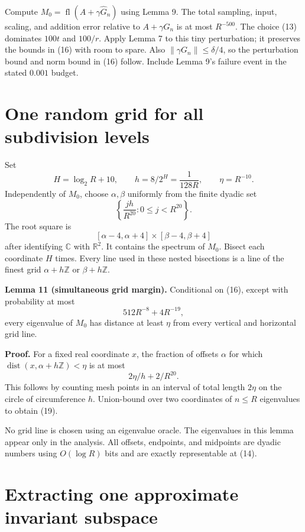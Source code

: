 \documentclass[10pt,a4paper]{article}
\begin{document}
Compute \(M_0=\operatorname{fl}(A+\gamma\widehat G_n)\) using Lemma 9.
The total sampling, input, scaling, and addition error relative to
\(A+\gamma G_n\) is at most \(R^{-500}\). The choice (13) dominates
\(100t\) and \(100/r\). Apply Lemma 7 to this tiny perturbation; it
preserves the bounds in (16) with room to spare. Also
\(\|\gamma G_n\|\le\delta/4\), so the perturbation bound and norm bound
in (16) follow. Include Lemma 9's failure event in the stated \(0.001\)
budget.

\section{One random grid for all subdivision
levels}\label{one-random-grid-for-all-subdivision-levels}

Set \[
 H=\log_2R+10,\qquad h=8/2^H=\frac1{128R},
 \qquad\eta=R^{-10}.
 \tag{18}
\] Independently of \(M_0\), choose \(\alpha,\beta\) uniformly from the
finite dyadic set \[
 \left\{\frac{jh}{R^{20}}:0\le j<R^{20}\right\}.
\] The root square is \[
 [\alpha-4,\alpha+4]\times[\beta-4,\beta+4]
\] after identifying \(\mathbb C\) with \(\mathbb R^2\). It contains the
spectrum of \(M_0\). Bisect each coordinate \(H\) times. Every line used
in these nested bisections is a line of the finest grid
\(\alpha+h\mathbb Z\) or \(\beta+h\mathbb Z\).

\textbf{Lemma 11 (simultaneous grid margin).} Conditional on (16),
except with probability at most \[
 512R^{-8}+4R^{-19},
 \tag{19}
\] every eigenvalue of \(M_0\) has distance at least \(\eta\) from every
vertical and horizontal grid line.

\textbf{Proof.} For a fixed real coordinate \(x\), the fraction of
offsets \(\alpha\) for which
\(\operatorname{dist}(x,\alpha+h\mathbb Z)<\eta\) is at most \[
 2\eta/h+2/R^{20}.
\] This follows by counting mesh points in an interval of total length
\(2\eta\) on the circle of circumference \(h\). Union-bound over two
coordinates of \(n\le R\) eigenvalues to obtain (19).

No grid line is chosen using an eigenvalue oracle. The eigenvalues in
this lemma appear only in the analysis. All offsets, endpoints, and
midpoints are dyadic numbers using \(O(\log R)\) bits and are exactly
representable at (14).

\section{Extracting one approximate invariant
subspace}\label{extracting-one-approximate-invariant-subspace}
\end{document}
